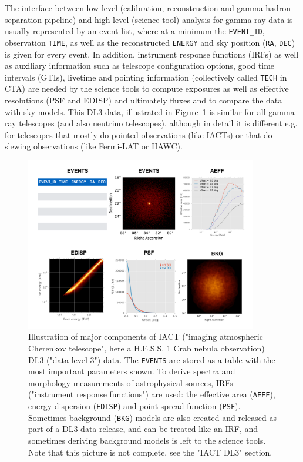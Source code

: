 The interface between low-level (calibration, reconstruction and gamma-hadron separation pipeline) and high-level (science tool) analysis for gamma-ray data is usually represented by an event list, where at a minimum the \texttt{EVENT\_ID}, observation \texttt{TIME}, as well as the reconstructed \texttt{ENERGY} and sky position (\texttt{RA}, \texttt{DEC}) is given for every event. In addition, instrument response functions (IRFs) as well as auxiliary information such as telescope configuration options, good time intervals (GTIs), livetime and pointing information (collectively called \texttt{TECH} in CTA) are needed by the science tools to compute exposures as well as effective resolutions (PSF and EDISP) and ultimately fluxes and to compare the data with sky models. This DL3 data, illustrated in Figure~\ref{fig:iact-dl3} is similar for all gamma-ray telescopes (and also neutrino telescopes), although in detail it is different e.g. for telescopes that mostly do pointed observations (like IACTs) or that do slewing observations (like Fermi-LAT or HAWC).

\begin{figure}[tb]
\centerline{\includegraphics[width=0.9\textwidth]{figures/iact-dl3}}
\caption{
Illustration of major components of IACT ("imaging atmospheric Cherenkov telescope", here a H.E.S.S. 1 Crab nebula observation) DL3 ("data level 3") data. The \texttt{EVENTS} are stored as a table with the most important parameters shown. To derive spectra and morphology measurements of astrophysical sources, IRFs ("instrument response functions") are used: the effective area (\texttt{AEFF}), energy dispersion (\texttt{EDISP}) and point spread function (\texttt{PSF}). Sometimes background (\texttt{BKG}) models are also created and released as part of a DL3 data release, and can be treated like an IRF, and sometimes deriving background models is left to the science tools. Note that this picture is not complete, see the "IACT DL3" section.
}
\label{fig:iact-dl3}
\end{figure}

